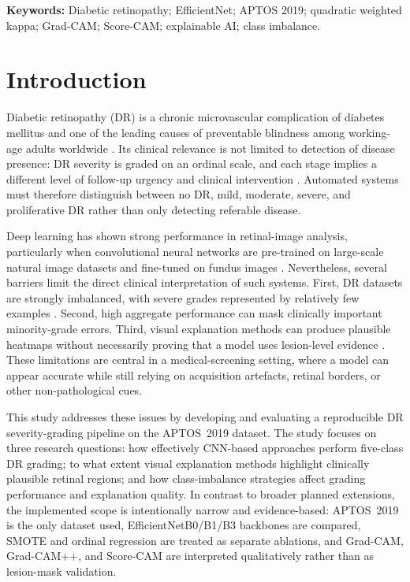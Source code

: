 \documentclass[11pt,a4paper]{article}
\begin{document}
\noindent\textbf{Keywords:} Diabetic retinopathy; EfficientNet; APTOS 2019; quadratic weighted kappa; Grad-CAM; Score-CAM; explainable AI; class imbalance.

\section{Introduction}
Diabetic retinopathy (DR) is a chronic microvascular complication of diabetes mellitus and one of the leading causes of preventable blindness among working-age adults worldwide \cite{teo2021}. Its clinical relevance is not limited to detection of disease presence: DR severity is graded on an ordinal scale, and each stage implies a different level of follow-up urgency and clinical intervention \cite{etdrs1991}. Automated systems must therefore distinguish between no DR, mild, moderate, severe, and proliferative DR rather than only detecting referable disease.

Deep learning has shown strong performance in retinal-image analysis, particularly when convolutional neural networks are pre-trained on large-scale natural image datasets and fine-tuned on fundus images \cite{gulshan2016,ting2017}. Nevertheless, several barriers limit the direct clinical interpretation of such systems. First, DR datasets are strongly imbalanced, with severe grades represented by relatively few examples \cite{atwany2022}. Second, high aggregate performance can mask clinically important minority-grade errors. Third, visual explanation methods can produce plausible heatmaps without necessarily proving that a model uses lesion-level evidence \cite{ayhan2022}. These limitations are central in a medical-screening setting, where a model can appear accurate while still relying on acquisition artefacts, retinal borders, or other non-pathological cues.

This study addresses these issues by developing and evaluating a reproducible DR severity-grading pipeline on the APTOS~2019 dataset. The study focuses on three research questions: how effectively CNN-based approaches perform five-class DR grading; to what extent visual explanation methods highlight clinically plausible retinal regions; and how class-imbalance strategies affect grading performance and explanation quality. In contrast to broader planned extensions, the implemented scope is intentionally narrow and evidence-based: APTOS~2019 is the only dataset used, EfficientNetB0/B1/B3 backbones are compared, SMOTE and ordinal regression are treated as separate ablations, and Grad-CAM, Grad-CAM++, and Score-CAM are interpreted qualitatively rather than as lesion-mask validation.
\end{document}
